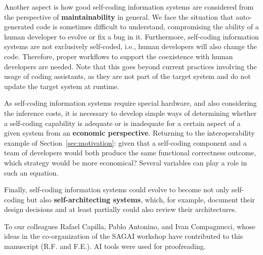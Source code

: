 \documentclass[sigconf]{acmart}
\theoremstyle{definition}
\begin{document}
Another aspect is how good self-coding information systems are considered from the perspective of \textbf{maintainability} in general. We face the situation that auto-generated code is sometimes difficult to understand, compromising the ability of a human developer to evolve or fix a bug in it. Furthermore, self-coding information systems are not exclusively self-coded, i.e., human developers will also change the code. Therefore, proper workflows to support the coexistence with human developers are needed. Note that this goes beyond current practices involving the usage of coding assistants, as they are not part of the target system and do not update the target system at runtime.

As self-coding information systems require special hardware, and also considering the inference costs, it is necessary to develop simple ways of determining whether a self-coding capability is adequate or is inadequate for a certain aspect of a given system from an \textbf{economic perspective}. Returning to the interoperability example of Section~\ref{sec:motivation}: given that a self-coding component and a team of developers would both produce the same functional correctness outcome, which strategy would be more economical? Several variables can play a role in such an equation.

Finally, self-coding information systems could evolve to become not only self-coding but also \textbf{self-architecting systems}, which, for example, document their design decisions and at least partially could also review their architectures.






\begin{acks}
To our colleagues Rafael Capilla, Pablo Antonino, and Ivan Compagnucci, whose ideas in the co-organization of the SAGAI workshop have contributed to this manuscript (R.F. and F.E.). AI tools were used for proofreading.
\end{acks}





\end{document}
